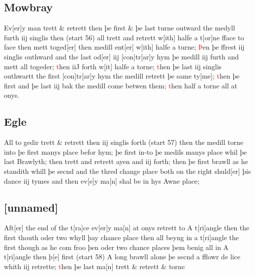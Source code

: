 \documentclass[12pt,letter]{article} %
\newcommand{\red}[1]{\textcolor{red}{#1}}
\newcommand{\srcpg}[1]{(start #1)}
\begin{document}
\subsection{Mowbray}
Ev{[}er{]}y man trett \& retrett then þe first \& þe last turne outward
the medyll furth iij singlis then \srcpg{56} all trett and retrett
w{[}ith{]} halfe a t{[}or{]}ne fface to face then mett toged{[}er{]}
then medill ent{[}er{]} w{[}ith{]} halfe a turne; \red{Þ}en þe  ffrest iij
singlis outhward and the last od{[}er{]} iij {[}con{]}tr{[}ar{]}y hym þe
medill iij furth and mett all togeder; \red{t}hen iiJ forth w{[}it{]} halfe a
torne; \red{t}hen þe last iij singlis outhwartt the first {[}con{]}tr{[}ar{]}y
hym the medill retrett þe same ty{[}me{]}; \red{t}hen þe first and þe last iij
bak the medill come betwen them; \red{t}hen half a torne all at onys.

\subsection{Egle}
All to gedir trett \& retrett then iij singlis forth \srcpg{57} then the
medill torne into þe first manys place befor hym; þe first in-to þe
medils manys place whil þe last Brawlyth; then trett and retrett ayen
and iij forth; then þe first brawll as he standith whill þe secnd and
the thred change place both on the right shuld{[}er{]} þis dance iij
tymes and then ev{[}e{]}y ma{[}n{]} shal be in hys Awne place;

\subsection{{[}unnamed{]}}
Aft{[}er{]} the end of the t{[}ra{]}ce ev{[}er{]}y ma{[}n{]} at
onys retrett to A t{[}ri{]}angle then the first thouth oder two whyll
þay chance place then all beyng in a t{[}ri{]}angle the first though as
he com froo þen oder two chance places þem benig all in A t{[}ri{]}angle
then þ{[}e{]} first \srcpg{58} A long brawll alone þe secnd a fflowr de
lice whith iij retrette; \red{t}hen þe last ma{[}n{]} trett \& retrett \&
torne
\end{document}
